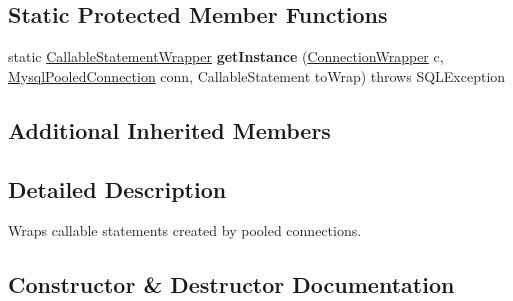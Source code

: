 \subsection*{Static Protected Member Functions}
\begin{DoxyCompactItemize}
\item 
\mbox{\label{classcom_1_1mysql_1_1jdbc_1_1jdbc2_1_1optional_1_1_callable_statement_wrapper_a13ccf60eb6e888c0f343363095feb02e}} 
static \mbox{\hyperlink{classcom_1_1mysql_1_1jdbc_1_1jdbc2_1_1optional_1_1_callable_statement_wrapper}{Callable\+Statement\+Wrapper}} {\bfseries get\+Instance} (\mbox{\hyperlink{classcom_1_1mysql_1_1jdbc_1_1jdbc2_1_1optional_1_1_connection_wrapper}{Connection\+Wrapper}} c, \mbox{\hyperlink{classcom_1_1mysql_1_1jdbc_1_1jdbc2_1_1optional_1_1_mysql_pooled_connection}{Mysql\+Pooled\+Connection}} conn, Callable\+Statement to\+Wrap)  throws S\+Q\+L\+Exception 
\end{DoxyCompactItemize}
\subsection*{Additional Inherited Members}


\subsection{Detailed Description}
Wraps callable statements created by pooled connections. 

\subsection{Constructor \& Destructor Documentation}
\mbox{\label{classcom_1_1mysql_1_1jdbc_1_1jdbc2_1_1optional_1_1_callable_statement_wrapper_a1916f1cb5146f710443735935dada818}} 
